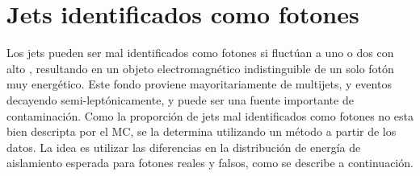 

%




\section{Jets identificados como fotones} \label{sec:jetfakes}

Los jets pueden ser mal identificados como fotones si fluctúan a uno o dos
{\pizero} con alto \pt, resultando en un objeto electromagnético indistinguible
de un solo fotón muy energético. Este fondo proviene mayoritariamente de
multijets, {\wjets} y eventos {\ttbar} decayendo semi-leptónicamente, y puede
ser una fuente importante de contaminación. Como la proporción de jets mal
identificados como fotones no esta bien descripta por el MC, se la determina
utilizando un método a partir de los datos. La idea es utilizar las diferencias
en la distribución de energía de aislamiento esperada para fotones reales y
falsos, como se describe a continuación.

